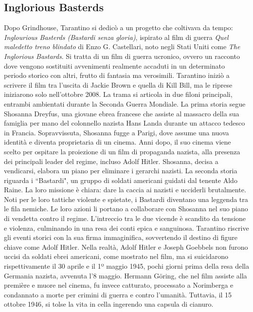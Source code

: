 \documentclass[12pt]{article} %
\begin{document}
\subsection{Inglorious Basterds}
\begin{flushleft}
    Dopo Grindhouse, Tarantino si dedicò a un progetto che coltivava da tempo: \textit{Inglourious Basterds (Bastardi senza gloria)}, ispirato al film di guerra \textit{Quel maledetto treno blindato} di Enzo G. Castellari, noto negli Stati Uniti come \textit{The Inglorious Bastards}. Si tratta di un film di guerra ucronico, ovvero un racconto dove vengono sostituiti avvenimenti realmente accaduti in un determinato periodo storico con altri, frutto di fantasia ma verosimili.  
    Tarantino iniziò a scrivere il film tra l’uscita di Jackie Brown e quella di Kill Bill, ma le riprese iniziarono solo nell’ottobre 2008. La trama si articola in due filoni principali, entrambi ambientati durante la Seconda Guerra Mondiale.  
    La prima storia segue Shosanna Dreyfus, una giovane ebrea francese che assiste al massacro della sua famiglia per mano del colonnello nazista Hans Landa durante un attacco tedesco in Francia. Sopravvissuta, Shosanna fugge a Parigi, dove assume una nuova identità e diventa proprietaria di un cinema. Anni dopo, il suo cinema viene scelto per ospitare la proiezione di un film di propaganda nazista, alla presenza dei principali leader del regime, incluso Adolf Hitler. Shosanna, decisa a vendicarsi, elabora un piano per eliminare i gerarchi nazisti. 
    La seconda storia riguarda i ``Bastardi", un gruppo di soldati americani guidati dal tenente Aldo Raine. La loro missione è chiara: dare la caccia ai nazisti e ucciderli brutalmente. Noti per le loro tattiche violente e spietate, i Bastardi diventano una leggenda tra le fila nemiche. Le loro azioni li portano a collaborare con Shosanna nel suo piano di vendetta contro il regime. 
    L’intreccio tra le due vicende è scandito da tensione e violenza, culminando in una resa dei conti epica e sanguinosa. Tarantino riscrive gli eventi storici con la sua firma immaginifica, sovvertendo il destino di figure chiave come Adolf Hitler.
    Nella realtà, Adolf Hitler e Joseph Goebbels non furono uccisi da soldati ebrei americani, come mostrato nel film, ma si suicidarono rispettivamente il 30 aprile e il 1º maggio 1945, pochi giorni prima della resa della Germania nazista, avvenuta l’8 maggio. Hermann Göring, che nel film assiste alla première e muore nel cinema, fu invece catturato, processato a Norimberga e condannato a morte per crimini di guerra e contro l’umanità. Tuttavia, il 15 ottobre 1946, si tolse la vita in cella ingerendo una capsula di cianuro.

\end{flushleft}
\end{document}
